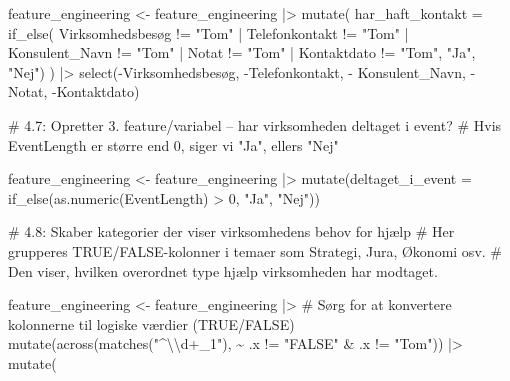 \documentclass[
  11pt,
  letterpaper,
  DIV=11,
  numbers=noendperiod]{scrartcl}
\newenvironment{Shaded}{\begin{snugshade}}{\end{snugshade}}
\newcommand{\AttributeTok}[1]{\textcolor[rgb]{0.40,0.45,0.13}{#1}}
\newcommand{\CommentTok}[1]{\textcolor[rgb]{0.37,0.37,0.37}{#1}}
\newcommand{\DecValTok}[1]{\textcolor[rgb]{0.68,0.00,0.00}{#1}}
\newcommand{\FunctionTok}[1]{\textcolor[rgb]{0.28,0.35,0.67}{#1}}
\newcommand{\NormalTok}[1]{\textcolor[rgb]{0.00,0.23,0.31}{#1}}
\newcommand{\OtherTok}[1]{\textcolor[rgb]{0.00,0.23,0.31}{#1}}
\newcommand{\SpecialCharTok}[1]{\textcolor[rgb]{0.37,0.37,0.37}{#1}}
\newcommand{\StringTok}[1]{\textcolor[rgb]{0.13,0.47,0.30}{#1}}
\begin{document}
\begin{Shaded}
\begin{Highlighting}[]
\NormalTok{feature\_engineering }\OtherTok{\textless{}{-}}\NormalTok{ feature\_engineering }\SpecialCharTok{|\textgreater{}}
  \FunctionTok{mutate}\NormalTok{(}
    \AttributeTok{har\_haft\_kontakt =} \FunctionTok{if\_else}\NormalTok{(}
\NormalTok{      Virksomhedsbesøg }\SpecialCharTok{!=} \StringTok{"Tom"} \SpecialCharTok{|}\NormalTok{ Telefonkontakt }\SpecialCharTok{!=} \StringTok{"Tom"} \SpecialCharTok{|} 
\NormalTok{        Konsulent\_Navn }\SpecialCharTok{!=} \StringTok{"Tom"} \SpecialCharTok{|}\NormalTok{ Notat }\SpecialCharTok{!=} \StringTok{"Tom"} \SpecialCharTok{|}\NormalTok{ Kontaktdato }\SpecialCharTok{!=} \StringTok{"Tom"}\NormalTok{,}
      \StringTok{"Ja"}\NormalTok{, }\StringTok{"Nej"}\NormalTok{)}
\NormalTok{    ) }\SpecialCharTok{|\textgreater{}}  
  \FunctionTok{select}\NormalTok{(}\SpecialCharTok{{-}}\NormalTok{Virksomhedsbesøg, }\SpecialCharTok{{-}}\NormalTok{Telefonkontakt, }\SpecialCharTok{{-}}\NormalTok{ Konsulent\_Navn, }
         \SpecialCharTok{{-}}\NormalTok{Notat, }\SpecialCharTok{{-}}\NormalTok{Kontaktdato)}

\CommentTok{\# 4.7: Opretter 3. feature/variabel – har virksomheden deltaget i event?}
\CommentTok{\# Hvis EventLength er større end 0, siger vi "Ja", ellers "Nej"}

\NormalTok{feature\_engineering }\OtherTok{\textless{}{-}}\NormalTok{ feature\_engineering }\SpecialCharTok{|\textgreater{}}
  \FunctionTok{mutate}\NormalTok{(}\AttributeTok{deltaget\_i\_event =} \FunctionTok{if\_else}\NormalTok{(}\FunctionTok{as.numeric}\NormalTok{(EventLength) }\SpecialCharTok{\textgreater{}} \DecValTok{0}\NormalTok{, }\StringTok{"Ja"}\NormalTok{, }\StringTok{"Nej"}\NormalTok{))}


\CommentTok{\# 4.8: Skaber kategorier der viser virksomhedens behov for hjælp}
\CommentTok{\# Her grupperes TRUE/FALSE{-}kolonner i temaer som Strategi, Jura, Økonomi osv.}
  \CommentTok{\# Den viser, hvilken overordnet type hjælp virksomheden har modtaget.}

\NormalTok{feature\_engineering }\OtherTok{\textless{}{-}}\NormalTok{ feature\_engineering }\SpecialCharTok{|\textgreater{}}
  \CommentTok{\# Sørg for at konvertere kolonnerne til logiske værdier (TRUE/FALSE)}
  \FunctionTok{mutate}\NormalTok{(}\FunctionTok{across}\NormalTok{(}\FunctionTok{matches}\NormalTok{(}\StringTok{"\^{}}\SpecialCharTok{\textbackslash{}\textbackslash{}}\StringTok{d+\_1"}\NormalTok{), }\SpecialCharTok{\textasciitilde{}}\NormalTok{ .x }\SpecialCharTok{!=} \StringTok{"FALSE"} \SpecialCharTok{\&}\NormalTok{ .x }\SpecialCharTok{!=} \StringTok{"Tom"}\NormalTok{)) }\SpecialCharTok{|\textgreater{}}
  \FunctionTok{mutate}\NormalTok{(}
    

\end{Highlighting}
\end{Shaded}
\end{document}
